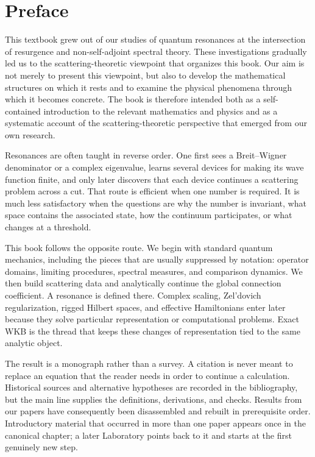\chapter*{Preface}
This textbook grew out of our studies of quantum resonances at the intersection of resurgence and non-self-adjoint spectral theory. These investigations gradually led us to the scattering-theoretic viewpoint that organizes this book. Our aim is not merely to present this viewpoint, but also to develop the mathematical structures on which it rests and to examine the physical phenomena through which it becomes concrete. The book is therefore intended both as a self-contained introduction to the relevant mathematics and physics and as a systematic account of the scattering-theoretic perspective that emerged from our own research.


Resonances are often taught in reverse order.  One first sees a
Breit--Wigner denominator or a complex eigenvalue, learns several devices for
making its wave function finite, and only later discovers that each device
continues a scattering problem across a cut.  That route is efficient when
one number is required.  It is much less satisfactory when the questions are
why the number is invariant, what space contains the associated state, how
the continuum participates, or what changes at a threshold.

This book follows the opposite route.  We begin with standard quantum
mechanics, including the pieces that are usually suppressed by notation:
operator domains, limiting procedures, spectral measures, and comparison
dynamics.  We then build scattering data and analytically continue the
global connection coefficient.  A resonance is defined there.  Complex
scaling, Zel'dovich regularization, rigged Hilbert spaces, and effective
Hamiltonians enter later because they solve particular representation or
computational problems.  Exact WKB is the thread that keeps these changes of
representation tied to the same analytic object.

The result is a monograph rather than a survey.  A citation is never meant to
replace an equation that the reader needs in order to continue a calculation.
Historical sources and alternative hypotheses are recorded in the
bibliography, but the main line supplies the definitions, derivations, and
checks.  Results from our papers have consequently been disassembled and
rebuilt in prerequisite order.  Introductory material that occurred in more
than one paper appears once in the canonical chapter; a later Laboratory
points back to it and starts at the first genuinely new step.



